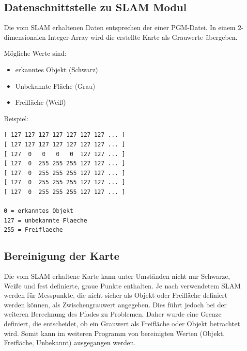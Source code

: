 \subsection{Datenschnittstelle zu SLAM Modul}

Die vom SLAM erhaltenen Daten entsprechen der einer PGM-Datei. In einem 2-dimensionalen Integer-Array wird die erstellte Karte als Grauwerte übergeben. 

Mögliche Werte sind:
\begin{itemize}
\item erkanntes Objekt (Schwarz)
\item Unbekannte Fläche (Grau)
\item Freifläche (Weiß)
\end{itemize}

\vspace{0.5cm}

Beispiel: 
\begin{lstlisting}
[ 127 127 127 127 127 127 127 ... ]
[ 127 127 127 127 127 127 127 ... ]
[ 127  0   0   0   0  127 127 ... ]
[ 127  0  255 255 255 127 127 ... ]
[ 127  0  255 255 255 127 127 ... ]
[ 127  0  255 255 255 127 127 ... ]
[ 127  0  255 255 255 127 127 ... ]

0 = erkanntes Objekt
127 = unbekannte Flaeche
255 = Freiflaeche
\end{lstlisting}


\subsection{Bereinigung der Karte}

Die vom SLAM erhaltene Karte kann unter Umständen nicht nur Schwarze, Weiße und fest definierte, graue Punkte enthalten. Je nach verwendetem SLAM werden für Messpunkte, die nicht sicher als Objekt oder Freifläche definiert werden können, als Zwischengrauwert angegeben. Dies führt jedoch bei der weiteren Berechnung des Pfades zu Problemen. Daher wurde eine Grenze definiert, die entscheidet, ob ein Grauwert als Freifläche oder Objekt betrachtet wird. Somit kann im weiteren Programm von bereinigten Werten (Objekt, Freifläche, Unbekannt) ausgegangen werden. 

